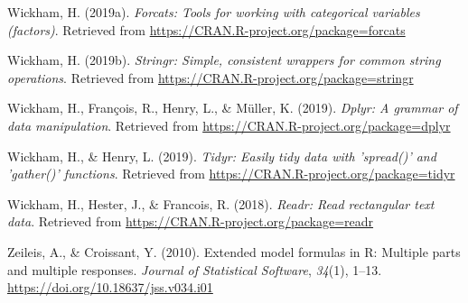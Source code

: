 \documentclass[man]{apa6}
\begin{document}
\leavevmode\hypertarget{ref-R-forcats}{}%
Wickham, H. (2019a). \emph{Forcats: Tools for working with categorical variables (factors)}. Retrieved from \url{https://CRAN.R-project.org/package=forcats}

\leavevmode\hypertarget{ref-R-stringr}{}%
Wickham, H. (2019b). \emph{Stringr: Simple, consistent wrappers for common string operations}. Retrieved from \url{https://CRAN.R-project.org/package=stringr}

\leavevmode\hypertarget{ref-R-dplyr}{}%
Wickham, H., François, R., Henry, L., \& Müller, K. (2019). \emph{Dplyr: A grammar of data manipulation}. Retrieved from \url{https://CRAN.R-project.org/package=dplyr}

\leavevmode\hypertarget{ref-R-tidyr}{}%
Wickham, H., \& Henry, L. (2019). \emph{Tidyr: Easily tidy data with 'spread()' and 'gather()' functions}. Retrieved from \url{https://CRAN.R-project.org/package=tidyr}

\leavevmode\hypertarget{ref-R-readr}{}%
Wickham, H., Hester, J., \& Francois, R. (2018). \emph{Readr: Read rectangular text data}. Retrieved from \url{https://CRAN.R-project.org/package=readr}

\leavevmode\hypertarget{ref-R-Formula}{}%
Zeileis, A., \& Croissant, Y. (2010). Extended model formulas in R: Multiple parts and multiple responses. \emph{Journal of Statistical Software}, \emph{34}(1), 1--13. \url{https://doi.org/10.18637/jss.v034.i01}

\endgroup
\end{document}
